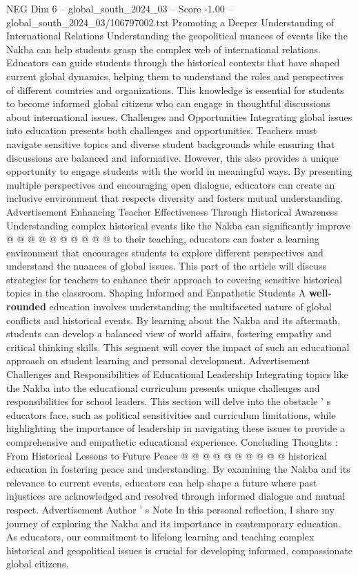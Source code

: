\begin{textsample}{NEG Dim 6 – global\_south\_2024\_03 – Score -1.00 – global\_south\_2024\_03/106797002.txt}
Promoting a Deeper Understanding of International Relations Understanding the geopolitical nuances of events like the Nakba can help students grasp the complex web of international relations.
Educators can guide students through the historical contexts that have shaped current global dynamics, helping them to understand the roles and perspectives of different countries and organizations.
This knowledge is essential for students to become informed global citizens who can engage in thoughtful discussions about international issues.
Challenges and Opportunities Integrating global issues into education presents both challenges and opportunities.
Teachers must navigate sensitive topics and diverse student backgrounds while ensuring that discussions are balanced and informative.
However, this also provides a unique opportunity to engage students with the world in meaningful ways.
By presenting multiple perspectives and encouraging open dialogue, educators can create an inclusive environment that respects diversity and fosters mutual understanding.
Advertisement Enhancing Teacher Effectiveness Through Historical Awareness Understanding complex historical events like the Nakba can significantly improve @ @ @ @ @ @ @ @ @ @ to their teaching, educators can foster a learning environment that encourages students to explore different perspectives and understand the nuances of global issues.
This part of the article will discuss strategies for teachers to enhance their approach to covering sensitive historical topics in the classroom.
Shaping Informed and Empathetic Students A \textbf{well-rounded} education involves understanding the multifaceted nature of global conflicts and historical events.
By learning about the Nakba and its aftermath, students can develop a balanced view of world affairs, fostering empathy and critical thinking skills.
This segment will cover the impact of such an educational approach on student learning and personal development.
Advertisement Challenges and Responsibilities of Educational Leadership Integrating topics like the Nakba into the educational curriculum presents unique challenges and responsibilities for school leaders.
This section will delve into the obstacle ' s educators face, such as political sensitivities and curriculum limitations, while highlighting the importance of leadership in navigating these issues to provide a comprehensive and empathetic educational experience.
Concluding Thoughts : From Historical Lessons to Future Peace @ @ @ @ @ @ @ @ @ @ historical education in fostering peace and understanding.
By examining the Nakba and its relevance to current events, educators can help shape a future where past injustices are acknowledged and resolved through informed dialogue and mutual respect.
Advertisement Author ' s Note In this personal reflection, I share my journey of exploring the Nakba and its importance in contemporary education.
As educators, our commitment to lifelong learning and teaching complex historical and geopolitical issues is crucial for developing informed, compassionate global citizens.

\end{textsample}
